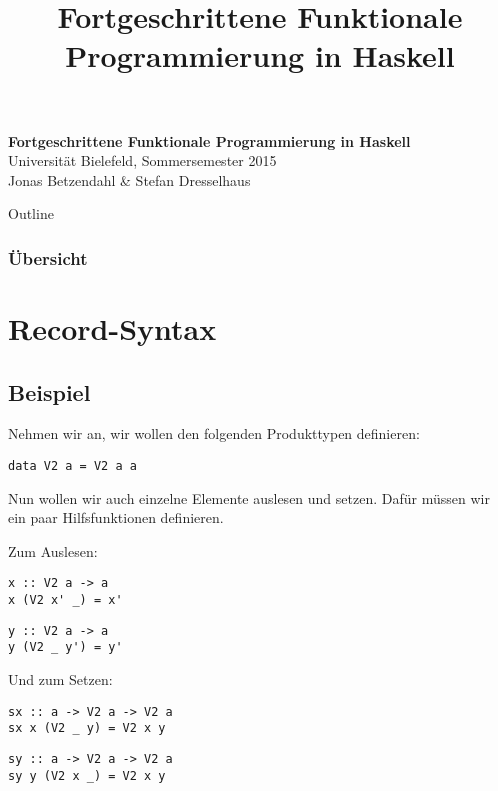 \documentclass{beamer}
\title{Fortgeschrittene Funktionale Programmierung in Haskell}
\begin{document}
  

  \begin{frame}
  \begin{center}
    \huge\textbf{Fortgeschrittene Funktionale Programmierung in Haskell}\\ \bigskip
    \LARGE Universität Bielefeld, Sommersemester 2015\\ \bigskip
    \large Jonas Betzendahl \& Stefan Dresselhaus
    \end{center}
  \end{frame}

\begin{frame}[allowframebreaks]{Outline}
\frametitle{Übersicht}
\tableofcontents[hideallsubsections]
\end{frame}

\section{Record-Syntax}

\subsection{Beispiel}

\begin{frame}[fragile]
Nehmen wir an, wir wollen den folgenden Produkttypen definieren:
\begin{verbatim}
data V2 a = V2 a a
\end{verbatim}
\pause
Nun wollen wir auch einzelne Elemente auslesen und setzen. Dafür müssen wir ein paar Hilfsfunktionen definieren.
\end{frame}

\begin{frame}[fragile]
Zum Auslesen:
\pause
\begin{verbatim}
x :: V2 a -> a
x (V2 x' _) = x'
\end{verbatim}
\pause
\begin{verbatim}
y :: V2 a -> a
y (V2 _ y') = y'
\end{verbatim}
\pause
\bigskip

Und zum Setzen:
\pause
\begin{verbatim}
sx :: a -> V2 a -> V2 a
sx x (V2 _ y) = V2 x y
\end{verbatim}
\pause
\begin{verbatim}
sy :: a -> V2 a -> V2 a
sy y (V2 x _) = V2 x y
\end{verbatim}
\end{frame}
\end{document}
